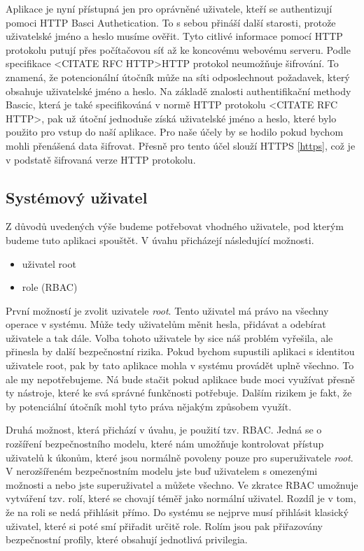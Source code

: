 Aplikace je nyní přístupná jen pro oprávněné uživatele, kteří se authentizují pomoci HTTP Basci Authetication. To s sebou přináší další starosti, protože uživatelské jméno a heslo musíme ověřit. Tyto citlivé informace pomocí HTTP protokolu putují přes počítačovou síť až ke koncovému webovému serveru. Podle specifikace <CITATE RFC HTTP>HTTP protokol neumožňuje šifrování. To znamená, že potencionální útočník může na síti odposlechnout požadavek, který obsahuje uživatelské jméno a heslo. Na základě znalosti authentifikační methody Bascic, která je také specifikováná v normě HTTP protokolu <CITATE RFC HTTP>, pak už útoční jednoduše získá uživatelské jméno a heslo, které bylo použito pro vstup do naší aplikace. Pro naše účely by se hodilo pokud bychom mohli přenášená data šifrovat. Přesně pro tento účel slouží HTTPS \ref{https}, což je v podstatě šifrovaná verze HTTP protokolu.
    \subsection{Systémový uživatel}
    \label{sysuser}
    Z důvodů uvedených výše budeme potřebovat vhodného uživatele, pod kterým budeme tuto aplikaci spouštět. V úvahu přicházejí následující možnosti.
    \begin{itemize}
      \item uživatel root
      \item role (RBAC)
    \end{itemize}

    První možností je zvolit uzivatele \emph{root}. Tento uživatel má právo na všechny operace v systému. Může tedy uživatelům měnit hesla, přidávat a odebírat uživatele a tak dále. Volba tohoto uživatele by sice náš problém vyřešila, ale přinesla by další bezpečnostní rizika. Pokud bychom supustili aplikaci s identitou uživatele root, pak by tato aplikace mohla v systému provádět uplně všechno. To ale my nepotřebujeme. Ná bude stačit pokud aplikace bude moci využívat přesně ty nástroje, které ke svá správné funkčnosti potřebuje. Dalším rizikem je fakt, že by potenciální útočník mohl tyto práva nějakým způsobem využít.

    Druhá možnost, která přichází v úvahu, je použití tzv. RBAC. Jedná se o rozšíření bezpečnostního modelu, které nám umožňuje kontrolovat přístup uživatelů k úkonům, které jsou normálně povoleny pouze pro superuživatele \emph{root}. V nerozšířeném bezpečnostním modelu jste buď uživatelem s omezenými možnosti a nebo jste superuživatel a můžete všechno.
    Ve zkratce RBAC umožnuje vytváření tzv. rolí, které se chovají téměř jako normální uživatel. Rozdíl je v tom, že na roli se nedá přihlásit přímo. Do systému se nejprve musí přihlásit klasický uživatel, které si poté smí přiřadit určitě role. Rolím jsou pak přiřazovány bezpečnostní profily, které obsahují jednotlivá privilegia.

